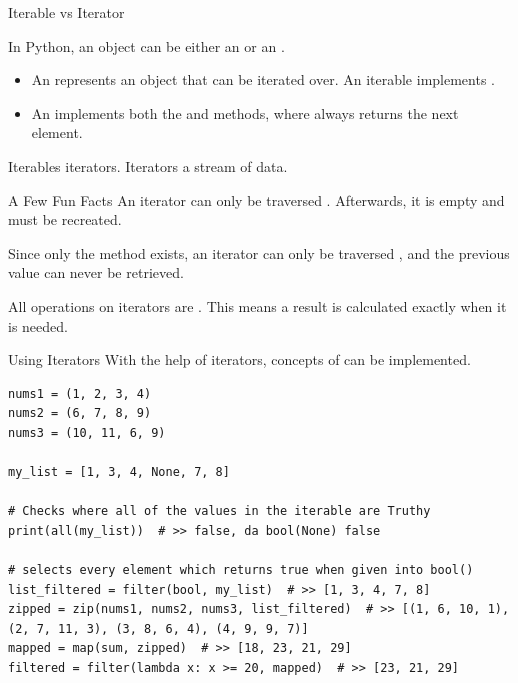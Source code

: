 \documentclass[12pt, aspectratio=169, usepdftitle=false, handout]{beamer}
\newcommand{\pp}[1]{\lpl{#1}}
\begin{document}
\begin{frame}{Iterable vs Iterator}
    
    In Python, an object can be either an  or an .
    \begin{itemize}
        \item An  represents an object that can be iterated over. An iterable implements \pp{__iter__()}.
        \item An  implements both the \pp{__iter__()} and \pp{__next__()} methods, where \pp{__next__()} always returns the next element.
    \end{itemize}

    Iterables  iterators. Iterators  a stream of data.

\end{frame}



\begin{frame}{A Few Fun Facts}
        An iterator can only be traversed . Afterwards, it is empty and must be recreated.

		\medskip
		
		Since only the \pp{__next__()} method exists, an iterator can only be traversed , and the previous value can never be retrieved.
		
		\medskip
		
		All operations on iterators are .\newline
		This means a result is calculated exactly when it is needed.

\end{frame}

\begin{frame}[fragile]{Using Iterators}
    With the help of iterators, concepts of  can be implemented.

    \begin{lstlisting}[language=pytiny]
nums1 = (1, 2, 3, 4)
nums2 = (6, 7, 8, 9)
nums3 = (10, 11, 6, 9)

my_list = [1, 3, 4, None, 7, 8]

# Checks where all of the values in the iterable are Truthy
print(all(my_list))  # >> false, da bool(None) false

# selects every element which returns true when given into bool()
list_filtered = filter(bool, my_list)  # >> [1, 3, 4, 7, 8]
zipped = zip(nums1, nums2, nums3, list_filtered)  # >> [(1, 6, 10, 1), (2, 7, 11, 3), (3, 8, 6, 4), (4, 9, 9, 7)]
mapped = map(sum, zipped)  # >> [18, 23, 21, 29]
filtered = filter(lambda x: x >= 20, mapped)  # >> [23, 21, 29]
    \end{lstlisting}
\end{frame}
\end{document}
